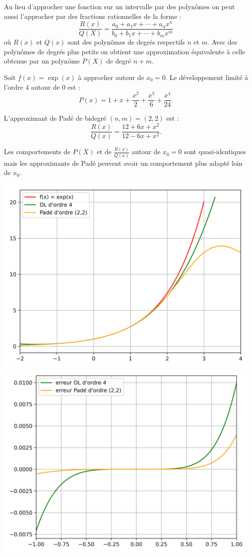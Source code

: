 \documentclass[11pt,class=report,crop=false]{standalone}
\begin{document}

Au lieu d’approcher une fonction sur un intervalle par des polynômes on peut aussi l'approcher par des fractions rationnelles de la forme :
$$\frac{R(x)}{Q(X)} = \frac{a_0 + a_1 x + \cdots + a_n x^n}{b_0 + b_1 x + \cdots + b_m x^m}$$
où $R(x)$ et $Q(x)$ sont des polynômes de degrés respectifs $n$ et $m$.
Avec des polynômes de degrés plus petits on obtient une approximation équivalente à celle obtenue par un polynôme $P(X)$ de degré $n+m$.

\begin{exemple}
Soit $f(x) = \exp(x)$ à  approcher autour de $x_0=0$.
Le développement limité à l'ordre $4$ autour de $0$ est :
$$P(x) = 1 + x + \frac{x^2}{2} + \frac{x^3}{6} + \frac{x^4}{24}.$$

L'approximant de Padé de bidegré $(n,m) = (2,2)$ est :
$$\frac{R(x)}{Q(x)} = \frac{12 + 6x + x^2}{12 - 6x + x^2}.$$

Les comportements de $P(X)$ et de $\frac{R(x)}{Q(x)}$ autour de $x_0=0$ sont quasi-identiques mais les 
approximants de Padé peuvent avoir un comportement plus adapté loin de $x_0$.

\begin{center}
  \includegraphics[scale=\myscale,scale=0.45]{figures/approx-pade-01} \qquad
  \includegraphics[scale=\myscale,scale=0.45]{figures/approx-pade-02} 
\end{center}

\end{exemple}
\end{document}
